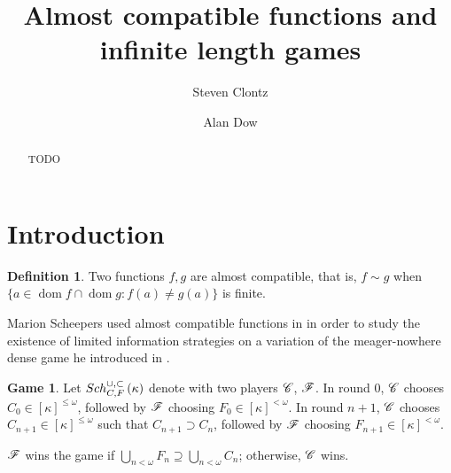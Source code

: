 \documentclass{amsart}
\theoremstyle{plain}
\theoremstyle{definition}
\newtheorem{definition}[theorem]{Definition}
\newtheorem{game}[theorem]{Game}
\theoremstyle{remark}
\theoremstyle{plain}
\theoremstyle{definition}
\theoremstyle{remark}
\def\dom{\mathop{dom}}
\begin{document}
\title{Almost compatible functions and infinite length games}




\author{Steven Clontz}
\address{Department of Mathematics and Statistics, UNC Charlotte,
Charlotte, NC 28262}
\author{Alan Dow}
\address{Department of Mathematics and Statistics, UNC Charlotte,
Charlotte, NC 28262}


\subjclass[2010]{}






\begin{abstract}
  TODO
\end{abstract}


\maketitle






\section{Introduction}

  \begin{definition}
    Two functions \(f,g\) are almost compatible, that is, \(f\sim g\) when
    \(\{a\in\dom f\cap\dom g:f(a)\not=g(a)\}\) is finite.
  \end{definition}

  Marion Scheepers used almost compatible functions in \cite{MR1129143} in order
  to study the existence of limited information strategies on a variation
  of the meager-nowhere dense game he introduced in \cite{MR1183703}.

  \begin{game}
    Let \(Sch^{\cup,\subset}_{C,F}\left({\kappa}\right)\) denote
    with two players \(\mathscr{C}\), \(\mathscr{F}\). In round \(0\), \(\mathscr{C}\) chooses
    \(C_0\in[\kappa]^{\leq\omega}\), followed by \(\mathscr{F}\) choosing
    \(F_0\in[\kappa]^{<\omega}\). In round \(n+1\), \(\mathscr{C}\) chooses
    \(C_{n+1}\in[\kappa]^{\leq\omega}\) such that \(C_{n+1}\supset C_n\), followed
    by \(\mathscr{F}\) choosing \(F_{n+1}\in[\kappa]^{<\omega}\).

    \(\mathscr{F}\) wins the game if
    \(\bigcup_{n<\omega} F_n\supseteq\bigcup_{n<\omega} C_n\); otherwise,
    \(\mathscr{C}\) wins.
  \end{game}
\end{document}
